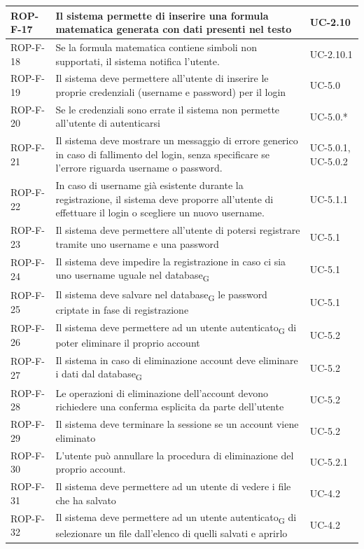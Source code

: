 \documentclass[11pt,a4paper]{article}
\newcommand{\gls}[1]{#1\textsubscript{G}}
\begin{document}
\begin{longtable}{|p{}|>{\raggedright\arraybackslash}p{}|p{}|}
\hline
ROP-F-17 & Il sistema permette di inserire una formula matematica generata con dati presenti nel testo & UC-2.10 \\
\hline
ROP-F-18 & Se la formula matematica contiene simboli non supportati, il sistema notifica l'utente. & UC-2.10.1 \\
\hline
ROP-F-19 & Il sistema deve permettere all'utente di inserire le proprie credenziali (username e password) per il login & UC-5.0 \\
\hline
ROP-F-20 & Se le credenziali sono errate il sistema non permette all'utente di autenticarsi & UC-5.0.* \\
\hline
ROP-F-21 & Il sistema deve mostrare un messaggio di errore generico in caso di fallimento del login, senza specificare se l'errore riguarda username o password. & UC-5.0.1, UC-5.0.2 \\
\hline
ROP-F-22 & In caso di username già esistente durante la registrazione, il sistema deve proporre all'utente di effettuare il login o scegliere un nuovo username. & UC-5.1.1 \\
\hline
ROP-F-23 & Il sistema deve permettere all'utente di potersi registrare tramite uno username e una password & UC-5.1 \\
\hline
ROP-F-24 & Il sistema deve impedire la registrazione in caso ci sia uno username uguale nel \gls{database} & UC-5.1 \\
\hline
ROP-F-25 & Il sistema deve salvare nel \gls{database} le password criptate in fase di registrazione & UC-5.1 \\
\hline
ROP-F-26 & Il sistema deve permettere ad un \gls{utente autenticato} di poter eliminare il proprio account & UC-5.2 \\
\hline
ROP-F-27 & Il sistema in caso di eliminazione account deve eliminare i dati dal \gls{database} & UC-5.2 \\
\hline
ROP-F-28 & Le operazioni di eliminazione dell'account devono richiedere una conferma esplicita da parte dell'utente & UC-5.2 \\
\hline
ROP-F-29 & Il sistema deve terminare la sessione se un account viene eliminato & UC-5.2 \\
\hline
ROP-F-30 & L'utente può annullare la procedura di eliminazione del proprio account. & UC-5.2.1 \\
\hline
ROP-F-31 & Il sistema deve permettere ad un utente di vedere i file che ha salvato & UC-4.2 \\
\hline
ROP-F-32 & Il sistema deve permettere ad un \gls{utente autenticato} di selezionare un file dall'elenco di quelli salvati e aprirlo & UC-4.2 \\

\end{longtable}
\end{document}
